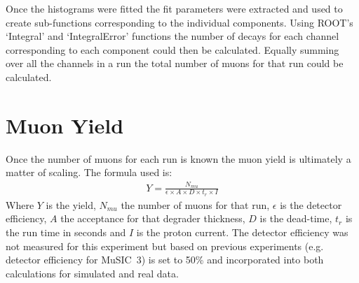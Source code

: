 Once the histograms were fitted the fit parameters were extracted and used to create sub-functions corresponding to the individual components. Using ROOT's `Integral' and `IntegralError' functions the number of decays for each channel corresponding to each component could then be calculated. Equally summing over all the channels in a run the total number of muons for that run could be calculated.
\section{Muon Yield} %
\label{sec:muon_yield}
Once the number of muons for each run is known the muon yield is ultimately a matter of scaling. The formula used is:
\begin{align}
    Y = \frac{N_{mu}}{\epsilon \times A \times D \times t_{r} \times I}
\end{align}
Where $Y$ is the yield, $N_{mu}$ the number of muons for that run, $\epsilon$ is the detector efficiency, $A$ the acceptance for that degrader thickness, $D$ is the dead-time, $t_{r}$ is the run time in seconds and $I$ is the proton current. The detector efficiency was not measured for this experiment but based on previous experiments (e.g. detector efficiency for MuSIC~3) is set to 50\% and incorporated into both calculations for simulated and real data. 
